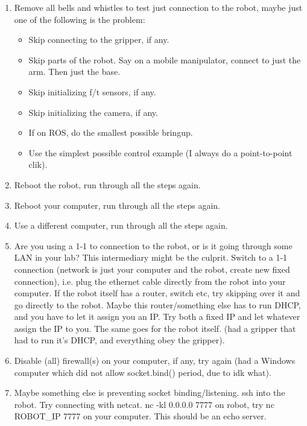 \begin{enumerate}
\begin{itemize}
		Look at the terminal for specific errors. Try running again.
	\item If using ROS, are you sure all topics are brought up? Do topic list. Then do topic echo on all of them.
\end{itemize}
\item Remove all bells and whistles to test just connection to the robot, maybe just one of the following is the problem:
\begin{itemize}
	\item Skip connecting to the gripper, if any.
	\item Skip parts of the robot. Say on a mobile manipulator, connect to just the arm. Then just the base. 
	\item Skip initializing f/t sensors, if any.
	\item Skip initializing the camera, if any.
	\item If on ROS, do the smallest possible bringup.
	\item Use the simplest possible control example (I always do a point-to-point clik).
\end{itemize}
\item Reboot the robot, run through all the steps again.
\item Reboot your computer, run through all the steps again.
\item Use a different computer, run through all the steps again.
\item Are you using a 1-1 to connection to the robot, or is it going through some LAN in your lab? 
	This intermediary might be the culprit.
	Switch to a 1-1 connection (network is just your computer and the robot, create new fixed connection),
	i.e. plug the ethernet cable directly from the robot into your computer.
	If the robot itself has a router, switch etc, try skipping over it and go directly to the robot.
	Maybe this router/something else has to run DHCP, and you have to let it assign you an IP.
	Try both a fixed IP and let whatever assign the IP to you. The same goes for the robot itself.
	(had a gripper that had to run it's DHCP, and everything obey the gripper).
\item Disable (all) firewall(s) on your computer, if any, try again 
	(had a Windows computer which did not allow socket.bind() period, due to idk what).
\item Maybe something else is preventing socket binding/listening. ssh into the robot. Try connecting with netcat. 
	nc -kl 0.0.0.0 7777 on robot, try nc ROBOT\_IP 7777 on your computer. This should be an echo server.

\end{enumerate}
